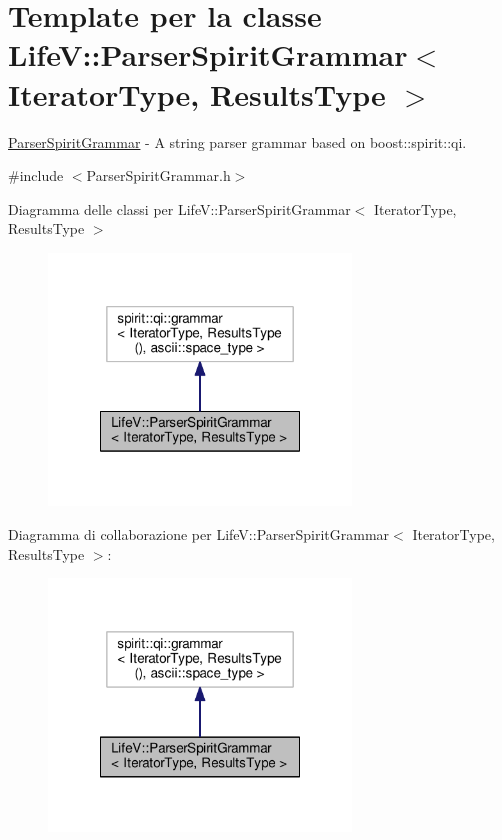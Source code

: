 \hypertarget{classLifeV_1_1ParserSpiritGrammar}{\section{Template per la classe Life\-V\-:\-:Parser\-Spirit\-Grammar$<$ Iterator\-Type, Results\-Type $>$}
\label{classLifeV_1_1ParserSpiritGrammar}
}


\hyperlink{classLifeV_1_1ParserSpiritGrammar}{Parser\-Spirit\-Grammar} -\/ A string parser grammar based on {\ttfamily boost\-::spirit\-::qi}.  




{\ttfamily \#include $<$Parser\-Spirit\-Grammar.\-h$>$}



Diagramma delle classi per Life\-V\-:\-:Parser\-Spirit\-Grammar$<$ Iterator\-Type, Results\-Type $>$
\nopagebreak
\begin{figure}[H]
\begin{center}
\leavevmode
\includegraphics[width=228pt]{classLifeV_1_1ParserSpiritGrammar__inherit__graph}
\end{center}
\end{figure}


Diagramma di collaborazione per Life\-V\-:\-:Parser\-Spirit\-Grammar$<$ Iterator\-Type, Results\-Type $>$\-:
\nopagebreak
\begin{figure}[H]
\begin{center}
\leavevmode
\includegraphics[width=228pt]{classLifeV_1_1ParserSpiritGrammar__coll__graph}
\end{center}
\end{figure}
